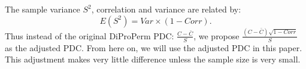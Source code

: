 \documentclass[12pt]{article}
\begin{document}
\begin{appendices}
The sample variance $S^2$, correlation and variance are related by: $$E(S^2)=Var\times(1-Corr).$$ Thus instead of the original DiProPerm PDC: $\frac{C-\bar C}{S}$, we propose $\frac{(C-\bar C)\sqrt{1-Corr}}{S}$ as the adjusted PDC. From here on, we will use the adjusted PDC in this paper. This adjustment makes very little difference unless the sample size is very small. 



\end{appendices}
\end{document}
